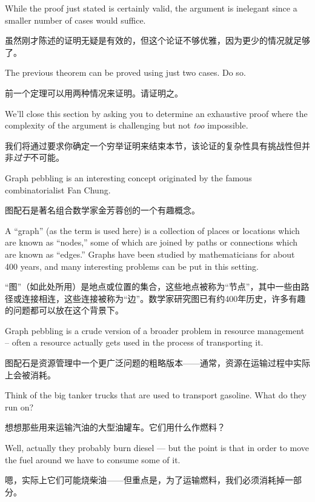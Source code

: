While the proof just stated is certainly valid, the argument is inelegant
since a smaller number of cases would suffice.

虽然刚才陈述的证明无疑是有效的，但这个论证不够优雅，因为更少的情况就足够了。

\begin{exer}
      The previous theorem can be proved using just two cases.  Do so.

      前一个定理可以用两种情况来证明。请证明之。
\end{exer}

We'll close this section by asking you to determine an exhaustive proof where
the complexity of the argument is challenging but not \emph{too} impossible.

我们将通过要求你确定一个穷举证明来结束本节，该论证的复杂性具有挑战性但并非\emph{过于}不可能。

 Graph pebbling is an interesting concept originated
by the famous combinatorialist  Fan Chung.

图配石是著名组合数学家金芳蓉创的一个有趣概念。

A ``graph''
(as the term is used here) is a collection
of places or locations which are known as ``nodes,'' some of which
are joined by paths or connections which are known as ``edges.''
Graphs have been studied by mathematicians for about 400 years, and
many interesting problems can be put in this setting.

“图”（如此处所用）是地点或位置的集合，这些地点被称为“节点”，其中一些由路径或连接相连，这些连接被称为“边”。数学家研究图已有约400年历史，许多有趣的问题都可以放在这个背景下。

Graph pebbling
is a crude version of a broader problem in resource management -- often
a resource actually gets used in the process of transporting it.

图配石是资源管理中一个更广泛问题的粗略版本——通常，资源在运输过程中实际上会被消耗。

Think of
the big tanker trucks that are used to transport gasoline.  What do they
run on?

想想那些用来运输汽油的大型油罐车。它们用什么作燃料？

Well, actually they probably burn diesel --- but the point is
that in order to move the fuel around we have to consume some of it.

嗯，实际上它们可能烧柴油——但重点是，为了运输燃料，我们必须消耗掉一部分。

